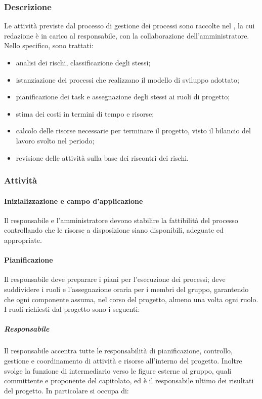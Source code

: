 	\subsubsection{Descrizione}
		Le attività previste dal processo di gestione dei processi sono raccolte nel , la cui redazione è in carico al responsabile, con la collaborazione dell'amministratore.
		\newline
		Nello specifico, sono trattati:

		\begin{itemize}
			\item analisi dei rischi, classificazione degli stessi;
			\item istanziazione dei processi che realizzano il modello di sviluppo adottato;
			\item pianificazione dei task e assegnazione degli stessi ai ruoli di progetto;
			\item stima dei costi in termini di tempo e risorse;
			\item calcolo delle risorse necessarie per terminare il progetto, visto il bilancio del lavoro svolto nel periodo;
			\item revisione delle attività sulla base dei riscontri dei rischi.
		\end{itemize}
	\subsubsection{Attività}
		\paragraph{Inizializzazione e campo d'applicazione}
			Il responsabile e l'amministratore devono stabilire la fattibilità del processo controllando che le risorse a disposizione siano disponibili, adeguate ed appropriate. 
		\paragraph{Pianificazione}
			Il responsabile deve preparare i piani per l'esecuzione dei processi; deve suddividere i ruoli e l'assegnazione oraria per i membri del gruppo, garantendo che ogni componente assuma, nel corso del progetto, almeno una volta ogni ruolo.
			I ruoli richiesti dal progetto sono i seguenti:

		\subparagraph{Responsabile}

			Il responsabile accentra tutte le responsabilità di pianificazione, controllo, gestione e coordinamento di attività e risorse all'interno del progetto. Inoltre svolge la funzione di intermediario verso le figure esterne al gruppo, quali committente e proponente del capitolato, ed è il responsabile ultimo dei risultati del progetto.
			\newline
			In particolare si occupa di:

